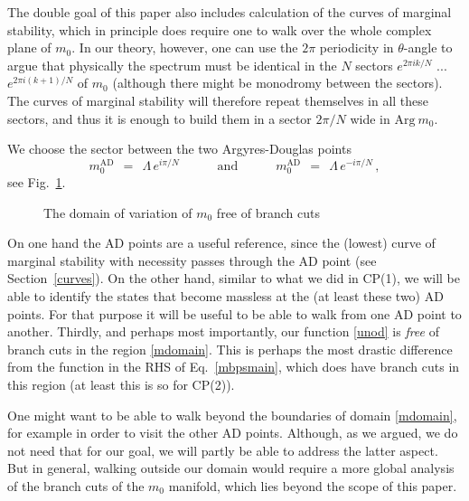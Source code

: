\documentclass[epsfig,12pt]{article}
\def\beq{\begin{equation}}
\def\eeq{\end{equation}}
\def\beq{\begin{equation}}
\def\eeq{\end{equation}}
\begin{document}
	The double goal of this paper also includes calculation of the 
	curves of marginal stability, which in principle does require one to walk
	over the whole complex plane of $ m_0 $.
	In our theory, however, one can use the $ 2\pi $ periodicity in $ \theta $-angle
	to argue that physically the spectrum must be identical in the $ N $ sectors 
	$ e^{2\pi i k / N} $ ... $ e^{2\pi i (k+1) / N} $ of $ m_0 $ 
	(although there might be monodromy between the sectors).
	The curves of marginal stability will therefore repeat themselves in all these
	sectors, and thus it is enough to build them in a sector $ 2\pi / N $ wide in $ \text{Arg}~m_0 $.
	
	We choose the sector between the two Argyres-Douglas points
\beq
\label{mdomain}
	m_0^\text{AD} ~~=~~ \Lambda \, e^{i \pi / N}
	\qquad\quad
	\text{and}
	\qquad\quad
	m_0^\text{AD} ~~=~~ \Lambda \, e^{- i \pi / N}\,,
\eeq
	see Fig.~\ref{domain}.
\begin{figure}
\begin{center}
\epsfxsize=8.0cm
\caption{The domain of variation of $ m_0 $ free of branch cuts}
\label{domain}
\end{center}
\end{figure}
	On one hand the AD points are a useful reference, since the (lowest) curve of marginal stability
	with necessity passes through the AD point (see Section~\ref{curves}).
	On the other hand, similar to what we did in CP(1), we will be able to identify the states
	that become massless at the (at least these two) AD points. 
	For that purpose it will be useful to be able to walk from one AD point to another.
	Thirdly, and perhaps most importantly, our function \eqref{unod} is {\it free} of branch cuts
	in the region \eqref{mdomain}.
	This is perhaps the most drastic difference from the function in the RHS of Eq.~\eqref{mbpsmain}, which 
	does have branch cuts in this region (at least this is so for CP(2)).

	One might want to be able to walk beyond the boundaries of domain \eqref{mdomain},
	for example in order to visit the other AD points.
	Although, as we argued, we do not need that for our goal, we will partly be able to address the latter aspect.
	But in general, walking outside our domain would require a more global analysis 
	of the branch cuts of the $ m_0 $ manifold, which lies beyond the scope of this paper.

\end{document}
